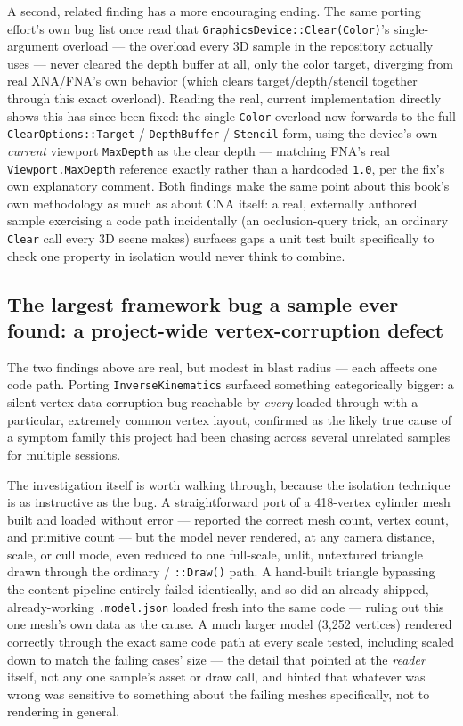 A second, related finding has a more encouraging ending. The same porting effort's own bug
list once read that \texttt{GraphicsDevice::Clear(Color)}'s single-argument overload --- the
overload every 3D sample in the repository actually uses --- never cleared the depth buffer at
all, only the color target, diverging from real XNA/FNA's own behavior (which clears
target/depth/stencil together through this exact overload). Reading the real, current
implementation directly shows this has since been fixed: the single-\texttt{Color} overload now
forwards to the full \texttt{ClearOptions::Target} / \texttt{DepthBuffer} / \texttt{Stencil}
form, using the device's own \emph{current} viewport \texttt{MaxDepth}
as the clear depth --- matching FNA's real \texttt{Viewport.MaxDepth} reference exactly rather
than a hardcoded \texttt{1.0}, per the fix's own explanatory comment. Both findings make the
same point about this book's own methodology as much as about CNA itself: a real, externally
authored sample exercising a code path incidentally (an occlusion-query trick, an ordinary
\texttt{Clear} call every 3D scene makes) surfaces gaps a unit test built specifically to check
one property in isolation would never think to combine.

\subsection{The largest framework bug a sample ever found: a project-wide vertex-corruption defect}

The two findings above are real, but modest in blast radius --- each affects one code path.
Porting \texttt{InverseKinematics} surfaced something categorically bigger: a silent
vertex-data corruption bug reachable by \emph{every}  loaded through
 with a particular, extremely common vertex layout, confirmed as
the likely true cause of a symptom family this project had been chasing across several
unrelated samples for multiple sessions.

The investigation itself is worth walking through, because the isolation technique is as
instructive as the bug. A straightforward port of a 418-vertex cylinder mesh built and
loaded without error ---  reported the correct mesh count, vertex
count, and primitive count --- but the model never rendered, at any camera distance, scale,
or cull mode, even reduced to one full-scale, unlit, untextured triangle drawn through the
ordinary  / \allowbreak{}\texttt{::Draw()} path. A
hand-built triangle bypassing the content pipeline entirely failed identically, and so did
an already-shipped, already-working \texttt{.model.json} loaded fresh into the same code
--- ruling out this one mesh's own data as the cause. A much larger model (3{,}252
vertices) rendered correctly through the exact same code path at every scale tested,
including scaled down to match the failing cases' size --- the detail that pointed at the
\emph{reader} itself, not any one sample's asset or draw call, and hinted that whatever was
wrong was sensitive to something about the failing meshes specifically, not to rendering in
general.

